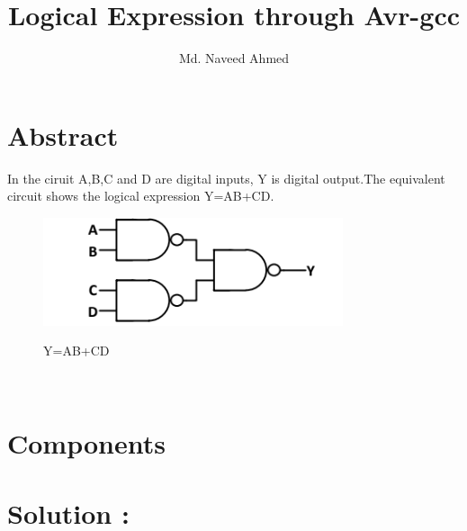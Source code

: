 \documentclass[journal,12pt,twocolumn]{IEEEtran}
\begin{document}
%

\theoremstyle{definition}
\newtheorem{theorem}{Theorem}[section]
\newtheorem{problem}{Problem}
\newtheorem{proposition}{Proposition}[section]
\newtheorem{lemma}{Lemma}[section]
\newtheorem{corollary}[theorem]{Corollary}
\newtheorem{example}{Example}[section]
\newtheorem{definition}{Definition}[section]
\newcommand{\BEQA}{\begin{eqnarray}}
\newcommand{\EEQA}{\end{eqnarray}}
\newcommand{\define}{\stackrel{\triangle}{=}}
\vspace{2cm}
\title{ 
Logical Expression through Avr-gcc
}

\author{Md. Naveed Ahmed}


\maketitle
\tableofcontents
\bigskip
%
\section{Abstract}

In the ciruit A,B,C and D are digital inputs, Y is digital output.The equivalent circuit shows the logical expression Y=AB+CD.
\begin{figure}[h]
    \centering
    \includegraphics[scale=0.8]{../figures/log_exp.png}\\
    \caption{Y=AB+CD}
\end{figure}\\
\section{\textbf{Components}}

\begin{table}[!h]
\centering
\caption{}
\label{table:7447_disp}
\end{table}
\section{\textbf{Solution :}}
\end{document}

